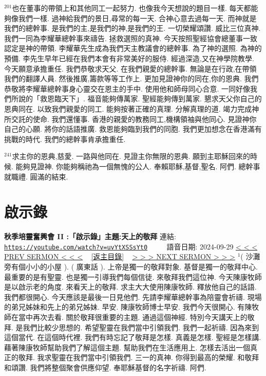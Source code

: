 \documentclass{book}
\begin{document}
$^{201}$也在董事的帶領上和其他同工一起努力.
也像我今天想說的題目一樣.
每天都能夠像我們一樣.
過神給我們的景日,尋常的每一天.
合神心意去過每一天.
而神就是我們的總幹事.
是我們的主,是我們的神,是我們的王.
一切榮耀頌讚.
威比三位真神.
我們一同為李耀華總幹事來禱告.
拯救選照的真神.
今天按照聖經協會總董事一致認定是神的帶領.
李耀華先生成為我們天主教議會的總幹事.
為了神的選照.
為神的預備.
李先生早年已經在我們本會有非常美好的服侍.
經過深造,又在神學院教學.
今天願意承擔重任.
我們恭敬求天父.
在我們親愛的總幹事.
無論是在行政,在帶領我們的翻譯人員.
然後推廣,籌款等等工作上.
更加見證神你的同在,你的恩典.
我們恭敬將李耀華總幹事身心靈交在恩主的手中.
使用他和師母同心合意.
一同好像我們所說的「救恩臨天下」.
福音能夠傳萬家.
聖經能夠傳到萬家.
懇求天父你自己的恩典同在.
以致我們親愛的同工.
能夠按著正確的真理.
分解真理的道.
竭力完成神所交託的使命.
我們還懂事.
香港的親愛的教務同工,機構領袖與他同心.
見證神你自己的心願.
將你的話語推廣.
救恩能夠臨到我們的同胞.
我們更加想念在香港滿有挑戰的時代.
我們的總幹事肯承擔重任.

$^{241}$求主你的恩典,慈愛.
一路與他同在.
見證主你無限的恩典.
願到主耶穌回來的時候.
能夠見證神.
你能夠稱祂為一個無愧的公人.
奉賴耶穌,基督,聖名.
阿們.
總幹事就職禮.
圓滿的結束.
\newpage



\section{啟示錄}
\label{sec:uvYtXSSsYt0}
\textbf{秋季培靈奮興會 II :「啟示錄」主題:天上的敬拜}
\newline
\newline
連結: \href{https://youtube.com/watch?v=uvYtXSSsYt0}{\texttt{https://youtube.com/watch?v=uvYtXSSsYt0}} ~~~~ 語音日期: 2024-09-29
\newline
\newline
\hyperref[sec:lB_bfqbs0xw]{\small{< < < PREV SERMON < < <}}
~
\hyperref[sec:index]{\small{[返主目錄]}}
~
\hyperref[sec:EjR8UEB4pjs]{\small{> > > NEXT SERMON > > >}}
\newline
\newline
$^{1}$( 沙灘旁有個小小的小屋 ).
( 廣東話 ).
上帝是獨一的敬拜對象.
基督是獨一的敬拜中心.
最重要的是有聖靈.
也是獨一引導我們每個信徒.
來敬拜我們這位神.
今天陳康牧師是以啟示老的角度.
來看天上的敬拜.
求主大大使用陳康牧師.
釋放他自己的話語.
我們都很開心.
今天應該是最後一日見他們.
先請李耀華總幹事為陪靈會祈禱.
現場的弟兄姊妹和先上的弟兄姊妹.
早安.
陳康牧師博士早安.
我們今天很開心.
有陳牧師在當中再次去看.
關於敬拜很重要的主題.
通過這個神經.
特別今天講天上的敬拜.
是我們比較少思想的.
希望聖靈在我們當中引領我們.
我們一起祈禱.
因為來到這個當代.
在這個時代裡.
我們有時忘記了敬拜是怎樣.
真義是怎樣.
聖經是怎樣講.
藉著陳康牧師幫助我們了解這個主題.
幫助我們在生活應用上.
怎樣去活出一個真正的敬拜.
我求聖靈在我們當中引領我們.
三一的真神.
你得到最高的榮耀.
和敬拜和頌讚.
我們將整個聚會供應仰望.
奉耶穌基督的名字祈禱.
阿們.
\end{document}
